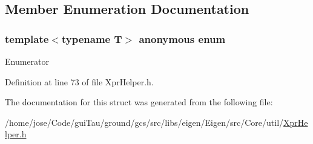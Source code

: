 \subsection{Member Enumeration Documentation}
\hypertarget{structei__functor__traits_a26a3ac5ec00d034327de204ae1fbd85b}{\subsubsection[{anonymous enum}]{\setlength{\rightskip}{0pt plus 5cm}template$<$typename T$>$ anonymous enum}}\label{structei__functor__traits_a26a3ac5ec00d034327de204ae1fbd85b}
\begin{Desc}
\item[Enumerator]\par
\begin{description}
\item[{\em 
\hypertarget{structei__functor__traits_a26a3ac5ec00d034327de204ae1fbd85bab5f31087ee333273ce8b57fa30b8c5f3}{Cost}\label{structei__functor__traits_a26a3ac5ec00d034327de204ae1fbd85bab5f31087ee333273ce8b57fa30b8c5f3}
}]\item[{\em 
\hypertarget{structei__functor__traits_a26a3ac5ec00d034327de204ae1fbd85bad392d5a6225b61e6ca26f9824f1b2a37}{Packet\-Access}\label{structei__functor__traits_a26a3ac5ec00d034327de204ae1fbd85bad392d5a6225b61e6ca26f9824f1b2a37}
}]\end{description}
\end{Desc}


Definition at line 73 of file Xpr\-Helper.\-h.



The documentation for this struct was generated from the following file\-:\begin{DoxyCompactItemize}
\item 
/home/jose/\-Code/gui\-Tau/ground/gcs/src/libs/eigen/\-Eigen/src/\-Core/util/\hyperlink{_xpr_helper_8h}{Xpr\-Helper.\-h}\end{DoxyCompactItemize}
